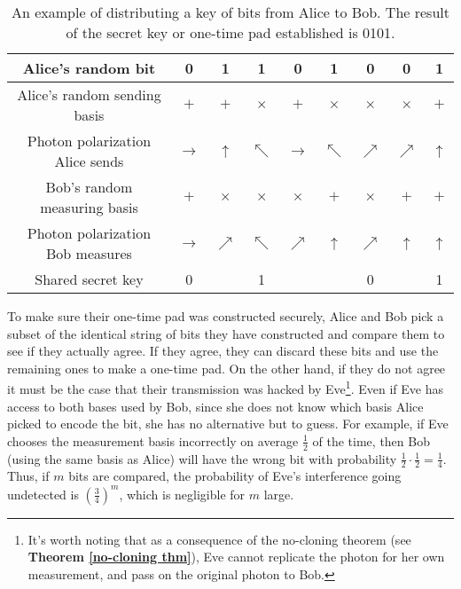 \begin{table}[]
\centering
\begin{tabular}{|c|c|c|c|c|c|c|c|c|}
\hline
Alice's random bit & 0 & 1 & 1 & 0 & 1 & 0 & 0 & 1 \\ \hline
Alice's random sending basis & $+$ & $+$ & $\times$ & $+$ & $\times$ & $\times$ & $\times$ & $+$ \\ \hline
Photon polarization Alice sends & $\rightarrow$ & $\uparrow$ & $\nwarrow$ & $\rightarrow$ & $\nwarrow$ & $\nearrow$ & $\nearrow$ & $\uparrow$ \\ \hline
Bob's random measuring basis & $+$ & $\times$ & $\times$ & $\times$ & $+$ & $\times$ & $+$ & $+$ \\ \hline
Photon polarization Bob measures & $\rightarrow$ & $\nearrow$ & $\nwarrow$ & $\nearrow$ & $\uparrow$ & $\nearrow$ & $\uparrow$ & $\uparrow$ \\ \hline
Shared secret key & 0 &  & 1 &  &  & 0 &  & 1 \\ \hline
\end{tabular}
\caption{An example of distributing a key of bits from Alice to Bob. The result of the secret key or one-time pad established is 0101.}
\label{tab:bb84 protocol example}
\end{table}


To make sure their one-time pad was constructed securely, Alice and Bob pick a subset of the identical string of bits they have constructed and compare them to see if they actually agree. If they agree, they can discard these bits and use the remaining ones to make a one-time pad. On the other hand, if they do not agree it must be the case that their transmission was hacked by Eve\footnote{It's worth noting that as a consequence of the no-cloning theorem (see \textbf{Theorem \ref{no-cloning thm}}), Eve cannot replicate the photon for her own measurement, and pass on the original photon to Bob.}.  Even if Eve has access to both bases used by Bob, since she does not know which basis Alice picked to encode the bit, she has no alternative but to guess. For example, if Eve chooses the measurement basis incorrectly on average $\frac{1}{2}$ of the time, then Bob (using the same basis as Alice) will have the wrong bit with probability $\frac{1}{2} \cdot \frac{1}{2}=\frac{1}{4}$. Thus, if $m$ bits are compared, the probability of Eve's interference going undetected is $(\frac{3}{4})^m$, which is negligible for $m$ large.

\pagebreak


